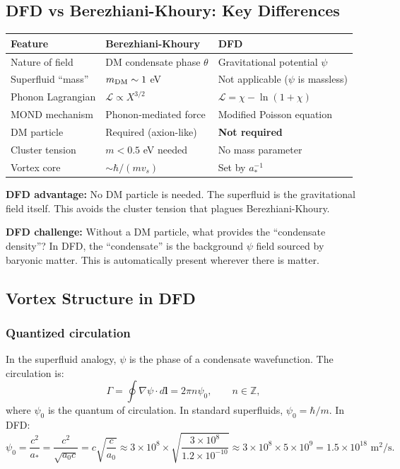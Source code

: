 \documentclass[11pt,a4paper]{article}
\begin{document}
\subsection{DFD vs Berezhiani-Khoury: Key Differences}

\begin{center}
\begin{tabular}{lll}
\toprule
\textbf{Feature} & \textbf{Berezhiani-Khoury} & \textbf{DFD} \\
\midrule
Nature of field & DM condensate phase $\theta$ & Gravitational potential $\psi$ \\
Superfluid ``mass'' & $m_{\rm DM} \sim 1$ eV & Not applicable ($\psi$ is massless) \\
Phonon Lagrangian & $\mathcal{L} \propto X^{3/2}$ & $\mathcal{L} = \chi - \ln(1+\chi)$ \\
MOND mechanism & Phonon-mediated force & Modified Poisson equation \\
DM particle & Required (axion-like) & \textbf{Not required} \\
Cluster tension & $m < 0.5$ eV needed & No mass parameter \\
Vortex core & $\sim \hbar/(m v_s)$ & Set by $a_*^{-1}$ \\
\bottomrule
\end{tabular}
\end{center}

\textbf{DFD advantage:} No DM particle is needed. The superfluid is the gravitational field itself. This avoids the cluster tension that plagues Berezhiani-Khoury.

\textbf{DFD challenge:} Without a DM particle, what provides the ``condensate density''? In DFD, the ``condensate'' is the background $\psi$ field sourced by baryonic matter. This is automatically present wherever there is matter.

\subsection{Vortex Structure in DFD}

\subsubsection{Quantized circulation}

In the superfluid analogy, $\psi$ is the phase of a condensate wavefunction. The circulation is:
\begin{equation}
\Gamma = \oint \nabla\psi \cdot d\mathbf{l} = 2\pi n \psi_0, \qquad n \in \mathbb{Z},
\end{equation}
where $\psi_0$ is the quantum of circulation. In standard superfluids, $\psi_0 = \hbar/m$. In DFD:
\begin{equation}
\psi_0 = \frac{c^2}{a_*} = \frac{c^2}{\sqrt{a_0 c}} = c\sqrt{\frac{c}{a_0}} \approx 3\times10^8 \times \sqrt{\frac{3\times10^8}{1.2\times10^{-10}}} \approx 3\times10^8 \times 5\times10^9 = 1.5 \times 10^{18}\text{ m}^2/\text{s}.
\end{equation}
\end{document}
